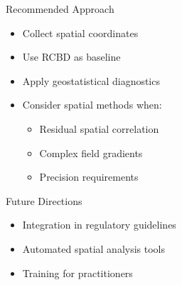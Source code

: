 \documentclass[aspectratio=43]{beamer}
\begin{document}
\begin{frame}
\begin{columns}[T]
        \begin{column}{0.5\textwidth}
            \begin{block}{Recommended Approach}
                \begin{itemize}
                    \item Collect spatial coordinates
                    \item Use RCBD as baseline
                    \item Apply geostatistical diagnostics
                    \item Consider spatial methods when:
                    \begin{itemize}
                        \scriptsize
                        \item Residual spatial correlation
                        \item Complex field gradients
                        \item Precision requirements
                    \end{itemize}
                \end{itemize}
            \end{block}
            
            \begin{block}{Future Directions}
                \begin{itemize}
                    \item Integration in regulatory guidelines
                    \item Automated spatial analysis tools
                    \item Training for practitioners
                \end{itemize}
            \end{block}
        \end{column}
    \end{columns}
\end{frame}
\end{document}
